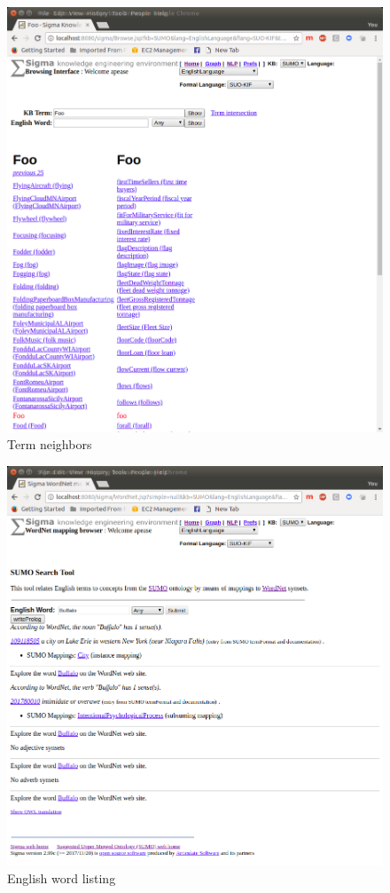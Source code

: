 \documentclass{book}
\begin{document}
\begin{figure}
  \centering
  \includegraphics[width=4.5in]{pictures/Alpha.png}
  \caption{Term neighbors}
  \label{fig:Alpha}
\end{figure}

\begin{figure}
  \centering
  \includegraphics[width=4.5in]{pictures/Buffalo.png}
  \caption{English word listing}
  \label{fig:Buffalo}
\end{figure}
\end{document}
